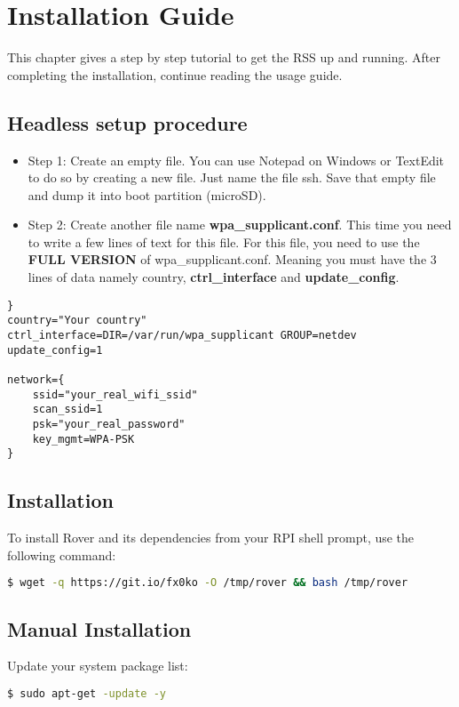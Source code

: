 \section{Installation Guide}
This chapter gives a step by step tutorial to get the RSS up and running. After completing the installation, continue reading the usage guide.

\subsection{Headless setup procedure}

\begin{itemize}
    \item Step 1: Create an empty file. You can use Notepad on Windows or TextEdit to do so by creating a new file. Just name the file ssh. Save that empty file and dump it into boot partition (microSD).
    \item Step 2: Create another file name \textbf{wpa\_supplicant.conf}. This time you need to write a few lines of text for this file. For this file, you need to use the \textbf{FULL VERSION} of wpa\_supplicant.conf. Meaning you must have the 3 lines of data namely country, \textbf{ctrl\_interface} and \textbf{update\_config}.
\end{itemize}

\begin{lstlisting}
}
country="Your country"
ctrl_interface=DIR=/var/run/wpa_supplicant GROUP=netdev
update_config=1

network={
    ssid="your_real_wifi_ssid"
    scan_ssid=1
    psk="your_real_password"
    key_mgmt=WPA-PSK
}
\end{lstlisting}
\newpage
\subsection{Installation}
\noindent To install Rover and its dependencies from your RPI shell prompt, use the following command:
\begin{lstlisting}[language=bash]
  $ wget -q https://git.io/fx0ko -O /tmp/rover && bash /tmp/rover
\end{lstlisting}

\subsection{Manual Installation}

Update your system package list:
\begin{lstlisting}[language=bash]
  $ sudo apt-get -update -y
\end{lstlisting}

